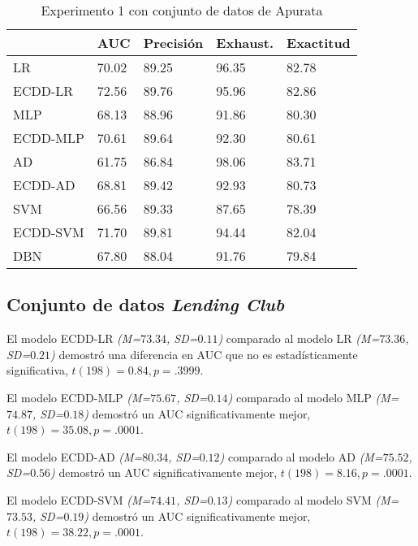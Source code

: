 \begin{table}[htbp]
\centering
\caption{Experimento 1 con conjunto de datos de Apurata}
\label{tab:apurata-proc1}
\begin{tabularx}{0.75\textwidth}{|l|Y Y Y Y|}
				\hline
				& AUC		& Precisión	& Exhaust.		& Exactitud	\\
				\hline
LR				& 70.02		& 89.25		& 96.35			& 82.78		\\		%
ECDD-LR			& 72.56		& 89.76		& 95.96			& 82.86		\\		%
				\hline
MLP				& 68.13		& 88.96		& 91.86			& 80.30		\\		%
ECDD-MLP		& 70.61		& 89.64		& 92.30			& 80.61		\\		%
				\hline
AD				& 61.75		& 86.84		& 98.06			& 83.71		\\		%
ECDD-AD			& 68.81		& 89.42		& 92.93			& 80.73		\\		%
				\hline
SVM				& 66.56		& 89.33		& 87.65			& 78.39		\\		%
ECDD-SVM		& 71.70		& 89.81		& 94.44			& 82.04		\\		%
				\hline
DBN				& 67.80		& 88.04		& 91.76			& 79.84		\\		%
				\hline
\end{tabularx}
\end{table}


\subsection{Conjunto de datos \textit{Lending Club}}

El modelo ECDD-LR \textit{(M=$73.34$, SD=$0.11$)} comparado al modelo \ac{LR} \textit{(M=$73.36$, SD=$0.21$)} demostró una diferencia en \ac{AUC} que no es estadísticamente significativa, $t(198)=0.84, p=.3999$.

El modelo ECDD-MLP \textit{(M=$75.67$, SD=$0.14$)} comparado al modelo \ac{MLP} \textit{(M=$74.87$, SD=$0.18$)} demostró un \ac{AUC} significativamente mejor, $t(198)=35.08, p=.0001$.

El modelo ECDD-AD \textit{(M=$80.34$, SD=$0.12$)} comparado al modelo \ac{AD} \textit{(M=$75.52$, SD=$0.56$)} demostró un \ac{AUC} significativamente mejor, $t(198)=8.16, p=.0001$.

El modelo ECDD-SVM \textit{(M=$74.41$, SD=$0.13$)} comparado al modelo \ac{SVM} \textit{(M=$73.53$, SD=$0.19$)} demostró un \ac{AUC} significativamente mejor, $t(198)=38.22, p=.0001$.

